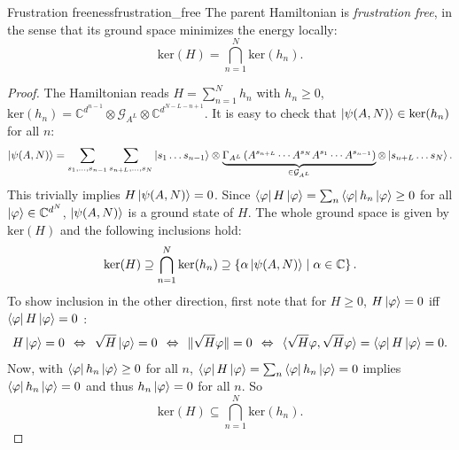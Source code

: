 \begin{theorem}{Frustration freeness}{frustration_free}
The parent Hamiltonian is \textit{frustration free}, in the sense that its ground space minimizes the energy locally:
\begin{equation} \label{eq_parent_hamiltonian}
	\mathrm{ker}(H) = \bigcap_{n=1}^N \mathrm{ker}(h_n).
\end{equation}
\end{theorem}
\begin{proof}
The Hamiltonian reads $H = \sum_{n=1}^N h_n$ with $h_n \geq 0$, $\mathrm{ker}(h_n) = \mathbb{C}^{d^{n-1}} \otimes \mathcal{G}_{A^L} \otimes \mathbb{C}^{d^{N-L-n+1}}$.
It is easy to check that $\ket{\psi(A,N)} \in \mathrm{ker}(h_n)$ for all $n$:
\begin{equation*}
	\ket{\psi(A,N)} = \sum_{s_1, \ldots, s_{n-1}} \sum_{s_{n+L}, \ldots, s_N} \ket{s_1 \ldots s_{n-1}} \otimes \underbrace{\Gamma_{A^L}\left(A^{s_{n+L}} \cdots A^{s_N} A^{s_1} \cdots A^{s_{n-1}} \right)}_{\in \mathcal{G}_{A^L}} \otimes \ket{s_{n+L} \ldots  s_N}.
\end{equation*}
This trivially implies $H\ket{\psi(A,N)} = 0$. Since $\bra{\varphi}H\ket{\varphi} = \sum_n  \bra{\varphi}h_n\ket{\varphi} \geq 0$ for all $\ket{\varphi} \in \mathbb{C}^{d^N}$, $\ket{\psi(A,N)}$ is a ground state of $H$. The whole ground space is given by $\mathrm{ker}(H)$ and the following inclusions hold:
\begin{equation}\label{eq_supset_kerH}
	\mathrm{ker}(H) \supseteq \bigcap_{n=1}^N \mathrm{ker}(h_n) \supseteq \left\{ \alpha\ket{\psi(A,N)} \mid \alpha \in \mathbb{C} \right\}. 
\end{equation}
To show inclusion in the other direction, first note that for $H \geq 0$, $H\ket{\varphi} = 0$ iff $\bra{\varphi}H\ket{\varphi} = 0$ \cite{tasaki2020physics}:
\begin{equation}
	H\ket{\varphi} = 0 \:\:\Leftrightarrow\:\: \sqrt{H}\ket{\varphi} = 0 \:\:\Leftrightarrow\:\: \Vert \sqrt{H}\varphi \Vert = 0 \:\:\Leftrightarrow\:\: \langle \sqrt{H}\varphi, \sqrt{H}\varphi \rangle = \bra{\varphi}H\ket{\varphi} = 0.
\end{equation}
Now, with $\bra{\varphi}h_n\ket{\varphi} \geq 0$ for all $n$, $\bra{\varphi}H\ket{\varphi} = \sum_n  \bra{\varphi}h_n\ket{\varphi} = 0$ implies $\bra{\varphi}h_n\ket{\varphi} = 0$ and thus $h_n\ket{\varphi} = 0$ for all $n$. So
\begin{equation}\label{eq_subset_kerH}
	\mathrm{ker}(H) \subseteq \bigcap_{n=1}^N \mathrm{ker}(h_n).
\end{equation}
\end{proof}

